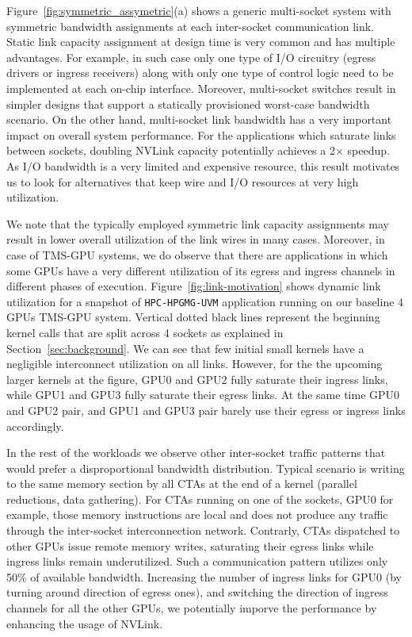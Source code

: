 Figure~\ref{fig:symmetric_assymetric}(a) shows a generic multi-socket system
with symmetric bandwidth assignments at each inter-socket communication link.
Static link capacity assignment at design time is very common and has multiple
advantages. For example, in such case only one type of I/O circuitry (egress
drivers or ingress receivers) along with only one type of control logic need to
be implemented at each on-chip interface. Moreover, multi-socket switches
result in simpler designs that support a statically provisioned worst-case
bandwidth scenario. On the other hand, multi-socket link bandwidth has a very
important impact on overall system performance. For the applications which saturate links between sockets, doubling NVLink capacity potentially achieves a 2$\times$ speedup.
As I/O bandwidth is a very limited and expensive resource, this
result motivates us to look for alternatives that keep wire and I/O resources
at very high utilization. 

We note that the typically employed symmetric link
capacity assignments may result in lower overall utilization of the link wires
in many cases. Moreover, in case of TMS-GPU systems, we do observe that there
are applications in which some GPUs have a very different utilization of its
egress and ingress channels in different phases of execution.
Figure~\ref{fig:link-motivation} shows dynamic link utilization for a snapshot
of \texttt{HPC-HPGMG-UVM} application running on our baseline 4 GPUs TMS-GPU
system. Vertical dotted black lines represent the beginning kernel calls that
are split across 4 sockets as explained in Section~\ref{sec:background}. We can see
that few initial small kernels have a negligible interconnect
utilization on all links. However, for the the upcoming larger kernels at the
figure, GPU0 and GPU2 fully saturate their ingress links, while GPU1 and GPU3
fully saturate their egress links. At the same time GPU0 and GPU2 pair,
and GPU1 and GPU3 pair barely use their egress or ingress links accordingly.

In the rest of the workloads we observe other inter-socket traffic patterns that would prefer a disproportional bandwidth distribution. Typical scenario is writing to the same memory section by all CTAs at the end of a kernel (parallel reductions, data gathering). For CTAs running on one of the sockets, GPU0 for example, those memory instructions are local and does not produce any traffic through the inter-socket interconnection network. Contrarly, CTAs dispatched to other GPUs issue remote memory writes, saturating their egress links while ingress links remain underutilized. Such a communication pattern utilizes only 50\% of available bandwidth. Increasing the number of ingress links for GPU0 (by turning around direction of egress ones), and switching the direction of ingress channels for all the other GPUs, we potentially imporve the performance by enhancing the usage of NVLink. 

